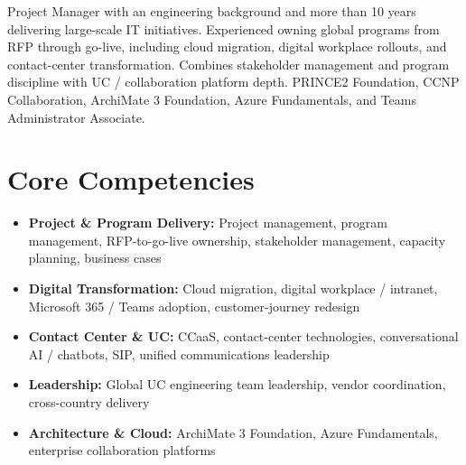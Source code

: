 \documentclass[11pt,a4paper,sans]{moderncv}
\begin{document}
\makecvtitle

\vspace{6pt}
\small{Project Manager with an engineering background and more than 10 years delivering large-scale IT initiatives. Experienced owning global programs from RFP through go-live, including cloud migration, digital workplace rollouts, and contact-center transformation. Combines stakeholder management and program discipline with UC / collaboration platform depth. PRINCE2 Foundation, CCNP Collaboration, ArchiMate 3 Foundation, Azure Fundamentals, and Teams Administrator Associate.}

\section{Core Competencies}
\vspace{1pt}
\begin{itemize}
\item \textbf{Project \& Program Delivery:} Project management, program management, RFP-to-go-live ownership, stakeholder management, capacity planning, business cases
\item \textbf{Digital Transformation:} Cloud migration, digital workplace / intranet, Microsoft 365 / Teams adoption, customer-journey redesign
\item \textbf{Contact Center \& UC:} CCaaS, contact-center technologies, conversational AI / chatbots, SIP, unified communications leadership
\item \textbf{Leadership:} Global UC engineering team leadership, vendor coordination, cross-country delivery
\item \textbf{Architecture \& Cloud:} ArchiMate 3 Foundation, Azure Fundamentals, enterprise collaboration platforms
\end{itemize}
\end{document}
